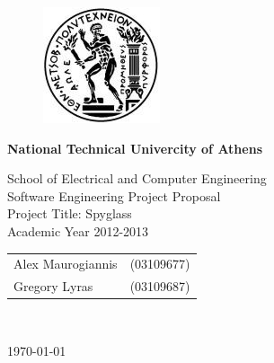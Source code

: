 \begin{titlepage}
\begin{center}
\begin{figure}[t] 
     \includegraphics[scale=0.7]{title/ntua_logo}
\end{figure}
\begin{LARGE}\textbf{National Technical Univercity of Athens\\}\end{LARGE}
\begin{Large}
School of Electrical and Computer Engineering\\
\vspace{2cm}
Software Engineering Project Proposal\\
Project Title: Spyglass\\
Academic Year 2012-2013\\
\end{Large}
\vspace{6cm}
\begin{tabular}{l r}
\Large{Alex Maurogiannis}&
\large{(03109677)}\\
\Large{Gregory Lyras}&
\large{(03109687)}\\
\end{tabular}\\
\vspace{5cm}

\vfill
\large\today\\
\end{center}
\end{titlepage}

